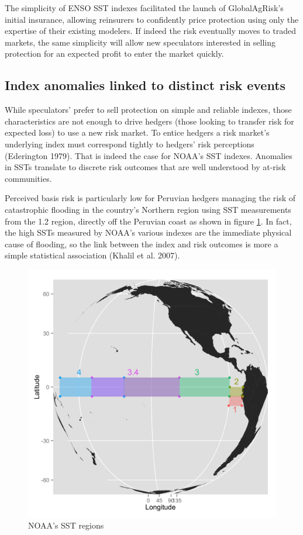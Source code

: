 \documentclass[article]{jss}
\begin{document}
The simplicity of ENSO SST indexes facilitated the launch of
GlobalAgRisk's initial insurance, allowing reinsurers to confidently
price protection using only the expertise of their existing modelers. If
indeed the risk eventually moves to traded markets, the same simplicity
will allow new speculators interested in selling protection for an
expected profit to enter the market quickly.

\subsection{Index anomalies linked to distinct risk
events}\label{index-anomalies-linked-to-distinct-risk-events}

While speculators' prefer to sell protection on simple and reliable
indexes, those characteristics are not enough to drive hedgers (those
looking to transfer risk for expected loss) to use a new risk market. To
entice hedgers a risk market's underlying index must correspond tightly
to hedgers' risk perceptions (Ederington 1979). That is indeed the case
for NOAA's SST indexes. Anomalies in SSTs translate to discrete risk
outcomes that are well understood by at-risk communities.

Perceived basis risk is particularly low for Peruvian hedgers managing
the risk of catastrophic flooding in the country's Northern region using
SST measurements from the  1.2 region, directly off the
Peruvian coast as shown in figure \ref{fig:ninoareas}. In fact, the high
SSTs measured by NOAA's various indexes are the immediate physical cause
of flooding, so the link between the index and risk outcomes is more a
simple statistical association (Khalil et al. 2007).

\begin{figure}
  \includegraphics[width=\linewidth]{img/region_map.png}
  \caption{NOAA's  SST regions}
  \label{fig:ninoareas}
\end{figure}
\end{document}
